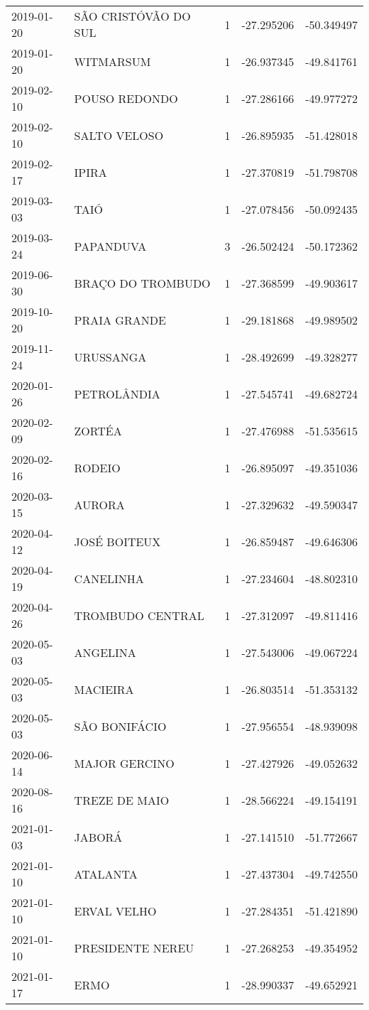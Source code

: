 \documentclass[
	12pt,				%
	openright,			%
	oneside,			%
	a4paper,			%
	english,			%
	french,				%
	spanish,			%
	brazil				%
	dvipsnames, table]{abntex2}
\begin{document}
\begin{longtable}[htbp]{llcrr}
2019-01-20 & SÃO CRISTÓVÃO DO SUL & 1 & -27.295206 & -50.349497 \\
2019-01-20 & WITMARSUM & 1 & -26.937345 & -49.841761 \\
2019-02-10 & POUSO REDONDO & 1 & -27.286166 & -49.977272 \\
2019-02-10 & SALTO VELOSO & 1 & -26.895935 & -51.428018 \\
2019-02-17 & IPIRA & 1 & -27.370819 & -51.798708 \\
2019-03-03 & TAIÓ & 1 & -27.078456 & -50.092435 \\
2019-03-24 & PAPANDUVA & 3 & -26.502424 & -50.172362 \\
2019-06-30 & BRAÇO DO TROMBUDO & 1 & -27.368599 & -49.903617 \\
2019-10-20 & PRAIA GRANDE & 1 & -29.181868 & -49.989502 \\
2019-11-24 & URUSSANGA & 1 & -28.492699 & -49.328277 \\
2020-01-26 & PETROLÂNDIA & 1 & -27.545741 & -49.682724 \\
2020-02-09 & ZORTÉA & 1 & -27.476988 & -51.535615 \\
2020-02-16 & RODEIO & 1 & -26.895097 & -49.351036 \\
2020-03-15 & AURORA & 1 & -27.329632 & -49.590347 \\
2020-04-12 & JOSÉ BOITEUX & 1 & -26.859487 & -49.646306 \\
2020-04-19 & CANELINHA & 1 & -27.234604 & -48.802310 \\
2020-04-26 & TROMBUDO CENTRAL & 1 & -27.312097 & -49.811416 \\
2020-05-03 & ANGELINA & 1 & -27.543006 & -49.067224 \\
2020-05-03 & MACIEIRA & 1 & -26.803514 & -51.353132 \\
2020-05-03 & SÃO BONIFÁCIO & 1 & -27.956554 & -48.939098 \\
2020-06-14 & MAJOR GERCINO & 1 & -27.427926 & -49.052632 \\
2020-08-16 & TREZE DE MAIO & 1 & -28.566224 & -49.154191 \\
2021-01-03 & JABORÁ & 1 & -27.141510 & -51.772667 \\
2021-01-10 & ATALANTA & 1 & -27.437304 & -49.742550 \\
2021-01-10 & ERVAL VELHO & 1 & -27.284351 & -51.421890 \\
2021-01-10 & PRESIDENTE NEREU & 1 & -27.268253 & -49.354952 \\
2021-01-17 & ERMO & 1 & -28.990337 & -49.652921 \\

\end{longtable}
\end{document}
